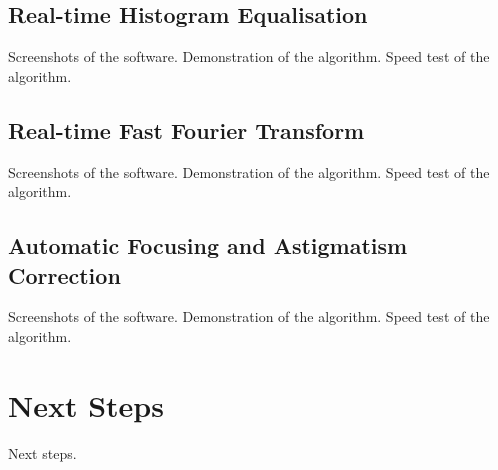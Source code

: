 \documentclass[conference]{IEEEtran}
\begin{document}
\subsection{Real-time Histogram Equalisation}
Screenshots of the software.
Demonstration of the algorithm.
Speed test of the algorithm.

\subsection{Real-time Fast Fourier Transform}
Screenshots of the software.
Demonstration of the algorithm.
Speed test of the algorithm.

\subsection{Automatic Focusing and Astigmatism Correction}
Screenshots of the software.
Demonstration of the algorithm.
Speed test of the algorithm.

\section{Next Steps}
Next steps.
\end{document}
